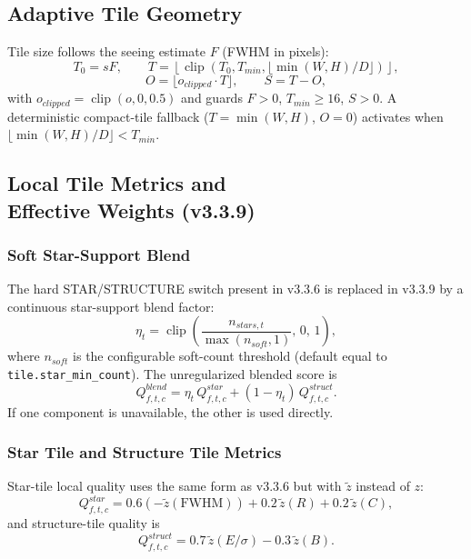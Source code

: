 \documentclass[10pt,twocolumn]{article}
\begin{document}
\subsection{Adaptive Tile Geometry}

Tile size follows the seeing estimate $F$ (FWHM in pixels):
\begin{equation}
  T_0 = sF, \qquad T = \left\lfloor\operatorname{clip}(T_0,T_{min},\lfloor\min(W,H)/D\rfloor)\right\rfloor,
\end{equation}
\begin{equation}
  O = \lfloor o_{clipped}\cdot T\rfloor, \qquad S = T-O,
\end{equation}
with $o_{clipped}=\operatorname{clip}(o,0,0.5)$ and guards $F>0$, $T_{min}\ge16$, $S>0$.
A deterministic compact-tile fallback ($T=\min(W,H)$, $O=0$) activates when
$\lfloor\min(W,H)/D\rfloor<T_{min}$.

\subsection{Local Tile Metrics and \protect \\Effective Weights (v3.3.9)}

\subsubsection{Soft Star-Support Blend}

The hard STAR/STRUCTURE switch present in v3.3.6 is replaced in v3.3.9 by a continuous
star-support blend factor:
\begin{equation}
  \eta_t = \operatorname{clip}\!\left(\frac{n_{stars,t}}{\max(n_{soft},1)},\,0,\,1\right),
\end{equation}
where $n_{soft}$ is the configurable soft-count threshold (default equal to
\texttt{tile.star\_min\_count}). The unregularized blended score is
\begin{equation}
  Q_{f,t,c}^{blend} = \eta_t\,Q_{f,t,c}^{star} + (1-\eta_t)\,Q_{f,t,c}^{struct}.
\end{equation}
If one component is unavailable, the other is used directly.

\subsubsection{Star Tile and Structure Tile Metrics}

Star-tile local quality uses the same form as v3.3.6 but with $\tilde{z}$ instead of $z$:
\begin{equation}
  Q_{f,t,c}^{star}
  = 0.6(-\tilde{z}(\mathrm{FWHM})) + 0.2\,\tilde{z}(R) + 0.2\,\tilde{z}(C),
\end{equation}
and structure-tile quality is
\begin{equation}
  Q_{f,t,c}^{struct}
  = 0.7\,\tilde{z}(E/\sigma) - 0.3\,\tilde{z}(B).
\end{equation}
\end{document}
